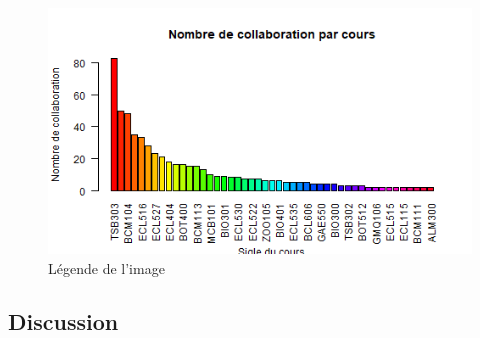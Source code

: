 \documentclass[9pt,twocolumn,twoside,]{pnas-new}
\begin{document}
\begin{figure}
  \centering
  \includegraphics[width=\linewidth]{sigle.png}
  \caption{Légende de l'image}
  \label{fig:sigle}
\end{figure}

\hypertarget{Discussion}{%
\subsection*{Discussion}\label{Discussion}}
\end{document}
